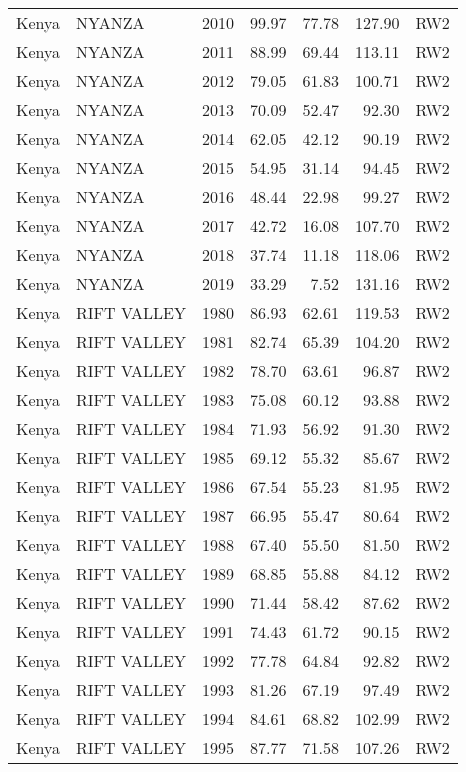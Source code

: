 \begin{longtable}{lllrrrl}
  Kenya & NYANZA & 2010 & 99.97 & 77.78 & 127.90 & RW2 \\ 
  Kenya & NYANZA & 2011 & 88.99 & 69.44 & 113.11 & RW2 \\ 
  Kenya & NYANZA & 2012 & 79.05 & 61.83 & 100.71 & RW2 \\ 
  Kenya & NYANZA & 2013 & 70.09 & 52.47 & 92.30 & RW2 \\ 
  Kenya & NYANZA & 2014 & 62.05 & 42.12 & 90.19 & RW2 \\ 
  Kenya & NYANZA & 2015 & 54.95 & 31.14 & 94.45 & RW2 \\ 
  Kenya & NYANZA & 2016 & 48.44 & 22.98 & 99.27 & RW2 \\ 
  Kenya & NYANZA & 2017 & 42.72 & 16.08 & 107.70 & RW2 \\ 
  Kenya & NYANZA & 2018 & 37.74 & 11.18 & 118.06 & RW2 \\ 
  Kenya & NYANZA & 2019 & 33.29 & 7.52 & 131.16 & RW2 \\ 
  Kenya & RIFT VALLEY & 1980 & 86.93 & 62.61 & 119.53 & RW2 \\ 
  Kenya & RIFT VALLEY & 1981 & 82.74 & 65.39 & 104.20 & RW2 \\ 
  Kenya & RIFT VALLEY & 1982 & 78.70 & 63.61 & 96.87 & RW2 \\ 
  Kenya & RIFT VALLEY & 1983 & 75.08 & 60.12 & 93.88 & RW2 \\ 
  Kenya & RIFT VALLEY & 1984 & 71.93 & 56.92 & 91.30 & RW2 \\ 
  Kenya & RIFT VALLEY & 1985 & 69.12 & 55.32 & 85.67 & RW2 \\ 
  Kenya & RIFT VALLEY & 1986 & 67.54 & 55.23 & 81.95 & RW2 \\ 
  Kenya & RIFT VALLEY & 1987 & 66.95 & 55.47 & 80.64 & RW2 \\ 
  Kenya & RIFT VALLEY & 1988 & 67.40 & 55.50 & 81.50 & RW2 \\ 
  Kenya & RIFT VALLEY & 1989 & 68.85 & 55.88 & 84.12 & RW2 \\ 
  Kenya & RIFT VALLEY & 1990 & 71.44 & 58.42 & 87.62 & RW2 \\ 
  Kenya & RIFT VALLEY & 1991 & 74.43 & 61.72 & 90.15 & RW2 \\ 
  Kenya & RIFT VALLEY & 1992 & 77.78 & 64.84 & 92.82 & RW2 \\ 
  Kenya & RIFT VALLEY & 1993 & 81.26 & 67.19 & 97.49 & RW2 \\ 
  Kenya & RIFT VALLEY & 1994 & 84.61 & 68.82 & 102.99 & RW2 \\ 
  Kenya & RIFT VALLEY & 1995 & 87.77 & 71.58 & 107.26 & RW2 \\ 

\end{longtable}
